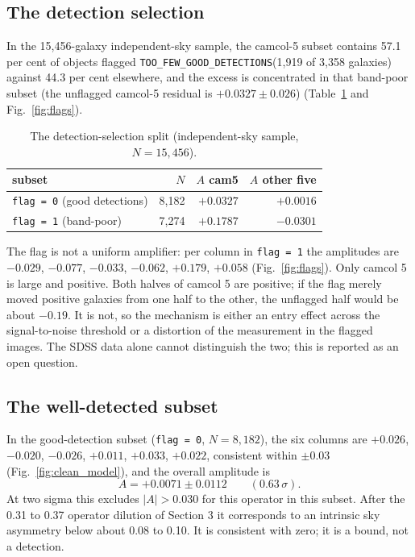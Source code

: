 \documentclass[linenumbers]{aa}
\newcommand{\toofew}{\texttt{TOO\_\allowbreak FEW\_\allowbreak GOOD\_\allowbreak DETECTIONS}}
\begin{document}
\subsection{The detection selection}
In the 15,456-galaxy independent-sky sample, the camcol-5 subset contains 57.1 per cent of objects
flagged \toofew (1,919 of 3,358 galaxies) against 44.3 per cent
elsewhere, and the excess is concentrated in that band-poor subset (the unflagged camcol-5
residual is $+0.0327 \pm 0.026$) (Table~\ref{tab:flags} and
Fig.~\ref{fig:flags}).

\begin{table}[h]
\centering
\caption{The detection-selection split (independent-sky sample, $N = 15,456$).}
\label{tab:flags}
\begin{tabular}{lrrr}
\toprule
subset & $N$ & $A$ cam5 & $A$ other five \\
\midrule
\texttt{flag = 0} (good detections) & 8,182 & $+0.0327$ & $+0.0016$ \\
\texttt{flag = 1} (band-poor) & 7,274 & $+0.1787$ & $-0.0301$ \\
\bottomrule
\end{tabular}
\end{table}

The flag is not a uniform amplifier: per column in \texttt{flag = 1} the amplitudes are $-0.029$,
$-0.077$, $-0.033$, $-0.062$, $+0.179$, $+0.058$ (Fig.~\ref{fig:flags}). Only camcol 5 is large and
positive. Both halves of camcol 5 are positive; if the flag merely moved positive galaxies from one
half to the other, the unflagged half would be about $-0.19$. It is not, so the mechanism is either
an entry effect across the signal-to-noise threshold or a distortion of the measurement in the
flagged images. The SDSS data alone cannot distinguish the two; this is reported as an open
question.

\subsection{The well-detected subset}
In the good-detection subset (\texttt{flag = 0}, $N = 8,182$), the six columns are $+0.026$,
$-0.020$, $-0.026$, $+0.011$, $+0.033$, $+0.022$, consistent within $\pm 0.03$
(Fig.~\ref{fig:clean_model}), and the overall amplitude is
\begin{equation}
A = +0.0071 \pm 0.0112 \qquad (0.63\,\sigma).
\end{equation}
At two sigma this excludes $|A| > 0.030$ for this operator in this subset. After the 0.31 to 0.37
operator dilution of Section 3 it corresponds to an intrinsic sky asymmetry below about 0.08 to
0.10. It is consistent with
zero; it is a bound, not a detection.
\end{document}

